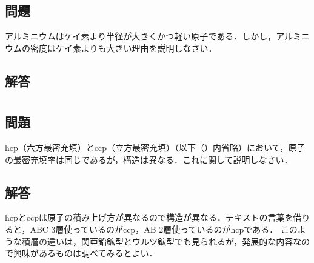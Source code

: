 \documentclass[dvipdfmx]{article}
\begin{document}
\section{}
  \subsection*{問題} %
    アルミニウムはケイ素より半径が大きくかつ軽い原子である．しかし，アルミニウムの密度はケイ素よりも大きい理由を説明しなさい．
  \subsection*{解答}

\section{}
  \subsection*{問題} %
    hcp（六方最密充填）とccp（立方最密充填）（以下（）内省略）において，原子の最密充填率は同じであるが，構造は異なる．これに関して説明しなさい．
  \subsection*{解答}
    hcpとccpは原子の積み上げ方が異なるので構造が異なる．テキストの言葉を借りると，ABC 3層使っているのがccp，AB 2層使っているのがhcpである．
    このような積層の違いは，閃亜鉛鉱型とウルツ鉱型でも見られるが，発展的な内容なので興味があるものは調べてみるとよい．

\section{}
\end{document}
